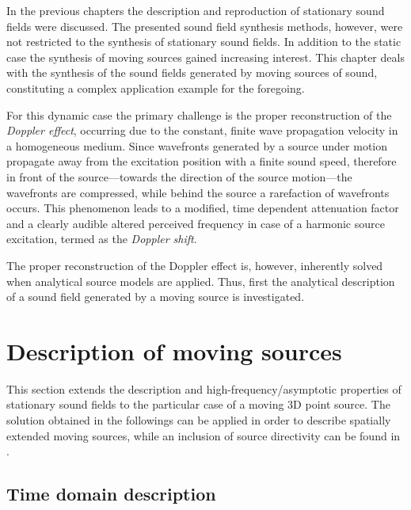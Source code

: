In the previous chapters the description and reproduction of stationary sound fields were discussed.
The presented sound field synthesis methods, however, were not restricted to the synthesis of stationary sound fields.
In addition to the static case the synthesis of moving sources gained increasing interest.
This chapter deals with the synthesis of the sound fields generated by moving sources of sound, constituting a complex application example for the foregoing.

For this dynamic case the primary challenge is the proper reconstruction of the \emph{Doppler effect}, occurring due to the constant, finite wave propagation velocity in a homogeneous medium.
Since wavefronts generated by a source under motion propagate away from the excitation position with a finite sound speed, therefore in front of the source---towards the direction of the source motion---the wavefronts are compressed, while behind the source a rarefaction of wavefronts occurs.
This phenomenon leads to a modified, time dependent attenuation factor and a clearly audible altered perceived frequency in case of a harmonic source excitation, termed as the \emph{Doppler shift}.

The proper reconstruction of the Doppler effect is, however, inherently solved when analytical source models are applied.
Thus, first the analytical description of a sound field generated by a moving source is investigated.

\section{Description of moving sources}

This section extends the description and high-frequency/asymptotic properties of stationary sound fields to the particular case of a moving 3D point source.
The solution obtained in the followings can be applied in order to describe spatially extended moving sources, while an inclusion of source directivity can be found in \cite{Warren1976, Ahrens2011_moving_source_WFS}.

\subsection{Time domain description}
	
